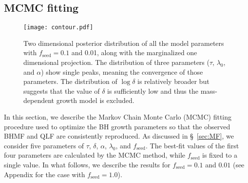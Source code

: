 \documentclass[twocolumn, twocolappendix]{aastex63}
\newcommand{\tlife}{\tau}
\newcommand{\fseed}{f_\mathrm{seed}}
\begin{document}
\begin{CJK*}{UTF8}{gbsn}
\vspace{2mm}
\subsection{MCMC fitting}\label{sec:fitting}

\begin{figure*}
\centering
\texttt{[image: contour.pdf]}
\caption{
Two dimensional posterior distribution of all the model parameters with $\fseed=0.1$ and 0.01, 
along with the marginalized one dimensional projection.
The distribution of three parameters ($\tau$, $\lambda_0$, and $\alpha$) show single peaks,
meaning the convergence of those parameters.
The distribution of $\log\delta$ is relatively broader but suggests that the value of $\delta$
is sufficiently low and thus the mass-dependent growth model is excluded.
}
\label{fig:contour}
\vspace{5mm}
\end{figure*}
%


In this section, we describe the Markov Chain Monte Carlo (MCMC) fitting procedure used to optimize 
the BH growth parameters so that the observed BHMF and QLF are consistently reproduced. 
As discussed in \S~\ref{sec:MF}, we consider five parameters of $\tlife$, $\delta$, $\alpha$, $\lambda_0$, and $\fseed$.
The best-fit values of the first four parameters are calculated by the MCMC method, while $\fseed$ is fixed to a single value.
In what follows, we describe the results for $\fseed = 0.1$ and $0.01$ (see Appendix for the case with $\fseed =1.0$).



\end{CJK*}
\end{document}
